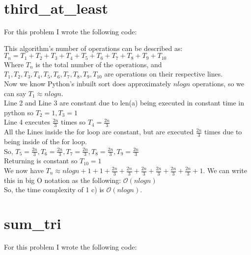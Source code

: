 \documentclass[12pt]{article}
\begin{document}
\section{third\_at\_least}
For this problem I wrote the following code:

This algorithm's number of operations can be described as:\\
$T_n = T_1 + T_2 + T_3 + T_4 + T_5 + T_6 + T_7 + T_8 + T_9 + T_{10}$\\
Where $T_n$ is the total number of the operations, and $T_1,T_2,T_3,T_4,T_5,T_6,T_7,T_8,T_9,T_{10}$ are operations on their respective lines.\\
Now we know Python's inbuilt sort does approximately $nlogn$ operations, so we can say $T_1 \approx nlogn$.\\
Line 2 and Line 3 are constant due to len(a) being executed in constant time in python so $T_2 = 1, T_3 = 1$\\
Line 4 executes $\frac{2n}{3}$ times so $T_4 = \frac{2n}{3}$\\
All the Lines inside the for loop are constant, but are executed  
$\frac{2n}{3}$ times due to being inside of the for loop.\\
So, $T_5 = \frac{2n}{3},T_6 = \frac{2n}{3},T_7 = \frac{2n}{3},T_8 = \frac{2n}{3},T_9 = \frac{2n}{3}$\\
Returning is constant so $T_{10} = 1$\\
We now have $T_n \approx nlogn + 1 + 1 + \frac{2n}{3} + \frac{2n}{3} + \frac{2n}{3} + \frac{2n}{3} + \frac{2n}{3} + \frac{2n}{3} + 1$.
We can write this in big O notation as the following:
$\mathcal{O}(nlogn)$\\
So, the time complexity of 1 c) is $\mathcal{O}(nlogn)$.
\section{sum\_tri}
For this problem I wrote the following code:

\end{document}
